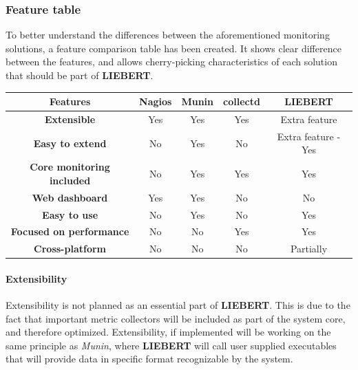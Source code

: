 \documentclass[12pt,a4paper,table]{article}
\begin{document}
            \subsubsection{Feature table}
                To better understand the differences between the aforementioned monitoring solutions, a feature comparison table has been created. It shows clear difference between the features, and allows cherry-picking characteristics of each solution that should be part of \textbf{LIEBERT}.

                \begin{center}
                    \begin{tabular}{ |c|c|c|c|c| }
                        \hline
                            Features & \textbf{Nagios} & \textbf{Munin} & \textbf{collectd} & \textbf{LIEBERT}\\
                            \hline
                            \textbf{Extensible} & Yes & Yes & Yes & Extra feature\\
                            \hline
                            \textbf{Easy to extend} & No & Yes & No & Extra feature - Yes\\
                            \hline
                            \textbf{Core monitoring included} & No & Yes & Yes & Yes\\
                            \hline
                            \textbf{Web dashboard} & Yes & Yes & No & No\\
                            \hline
                            \textbf{Easy to use} & No & Yes & No & Yes\\
                            \hline
                            \textbf{Focused on performance} & No & No & Yes & Yes\\
                            \hline
                            \textbf{Cross-platform} & No & No & No & Partially\\
                        \hline
                    \end{tabular}
                \end{center}

                \paragraph{Extensibility}
                    Extensibility is not planned as an essential part of \textbf{LIEBERT}. This is due to the fact that important metric collectors will be included as part of the system core, and therefore optimized. Extensibility, if implemented will be working on the same principle as \textit{Munin}, where \textbf{LIEBERT} will call user supplied executables that will provide data in specific format recognizable by the system.
\end{document}
